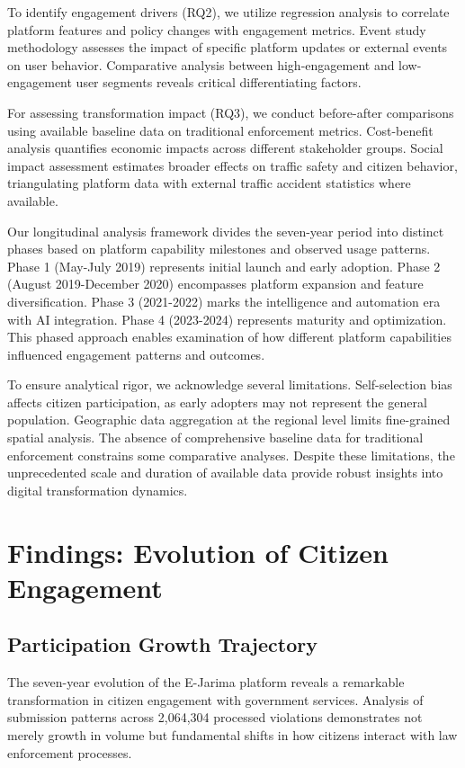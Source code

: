 \documentclass[pdflatex,sn-mathphys-num]{sn-jnl}%
\theoremstyle{thmstyleone}%
\theoremstyle{thmstyletwo}%
\theoremstyle{thmstylethree}%
\begin{document}
To identify engagement drivers (RQ2), we utilize regression analysis to correlate platform features and policy changes with engagement metrics. Event study methodology assesses the impact of specific platform updates or external events on user behavior. Comparative analysis between high-engagement and low-engagement user segments reveals critical differentiating factors.

For assessing transformation impact (RQ3), we conduct before-after comparisons using available baseline data on traditional enforcement metrics. Cost-benefit analysis quantifies economic impacts across different stakeholder groups. Social impact assessment estimates broader effects on traffic safety and citizen behavior, triangulating platform data with external traffic accident statistics where available.

Our longitudinal analysis framework divides the seven-year period into distinct phases based on platform capability milestones and observed usage patterns. Phase 1 (May-July 2019) represents initial launch and early adoption. Phase 2 (August 2019-December 2020) encompasses platform expansion and feature diversification. Phase 3 (2021-2022) marks the intelligence and automation era with AI integration. Phase 4 (2023-2024) represents maturity and optimization. This phased approach enables examination of how different platform capabilities influenced engagement patterns and outcomes.

To ensure analytical rigor, we acknowledge several limitations. Self-selection bias affects citizen participation, as early adopters may not represent the general population. Geographic data aggregation at the regional level limits fine-grained spatial analysis. The absence of comprehensive baseline data for traditional enforcement constrains some comparative analyses. Despite these limitations, the unprecedented scale and duration of available data provide robust insights into digital transformation dynamics.

\section{Findings: Evolution of Citizen Engagement}\label{sec4}

\subsection{Participation Growth Trajectory}\label{subsec12}

The seven-year evolution of the E-Jarima platform reveals a remarkable transformation in citizen engagement with government services. Analysis of submission patterns across 2,064,304 processed violations demonstrates not merely growth in volume but fundamental shifts in how citizens interact with law enforcement processes.
\end{document}
